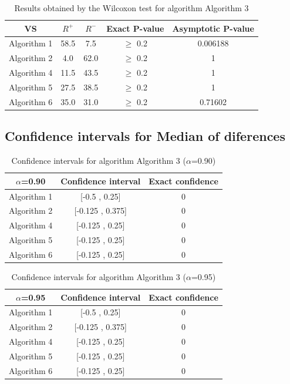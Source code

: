 \documentclass[a4paper,10pt]{article}
\begin{document}
\begin{table}[!htp]
\centering\small
\begin{tabular}{
|c|c|c|c|c|}
\hline
 VS & $R^{+}$ & $R^{-}$ & Exact P-value & Asymptotic P-value \\ \hline 
Algorithm 1 & 58.5 & 7.5 & $\geq$ 0.2 & 0.006188\\ \hline 
Algorithm 2 & 4.0 & 62.0 & $\geq$ 0.2 & 1\\ \hline 
Algorithm 4 & 11.5 & 43.5 & $\geq$ 0.2 & 1\\ \hline 
Algorithm 5 & 27.5 & 38.5 & $\geq$ 0.2 & 1\\ \hline 
Algorithm 6 & 35.0 & 31.0 & $\geq$ 0.2 & 0.71602\\ \hline 

\end{tabular}
\caption{Results obtained by the Wilcoxon test for algorithm Algorithm 3}
\end{table}

\subsection{Confidence intervals for Median of diferences}

\begin{table}[!htp]
\centering\small
\begin{tabular}{
|c|c|c|}
\hline
 $\alpha$=0.90 & Confidence interval & Exact confidence \\ \hline 
Algorithm 1 & [-0.5 , 0.25] & 0\\ \hline 
Algorithm 2 & [-0.125 , 0.375] & 0\\ \hline 
Algorithm 4 & [-0.125 , 0.25] & 0\\ \hline 
Algorithm 5 & [-0.125 , 0.25] & 0\\ \hline 
Algorithm 6 & [-0.125 , 0.25] & 0\\ \hline 

\end{tabular}
\caption{Confidence intervals for algorithm Algorithm 3 ($\alpha$=0.90)}
\end{table}
\begin{table}[!htp]
\centering\small
\begin{tabular}{
|c|c|c|}
\hline
 $\alpha$=0.95 & Confidence interval & Exact confidence \\ \hline 
Algorithm 1 & [-0.5 , 0.25] & 0\\ \hline 
Algorithm 2 & [-0.125 , 0.375] & 0\\ \hline 
Algorithm 4 & [-0.125 , 0.25] & 0\\ \hline 
Algorithm 5 & [-0.125 , 0.25] & 0\\ \hline 
Algorithm 6 & [-0.125 , 0.25] & 0\\ \hline 

\end{tabular}
\caption{Confidence intervals for algorithm Algorithm 3 ($\alpha$=0.95)}
\end{table}
\end{document}
